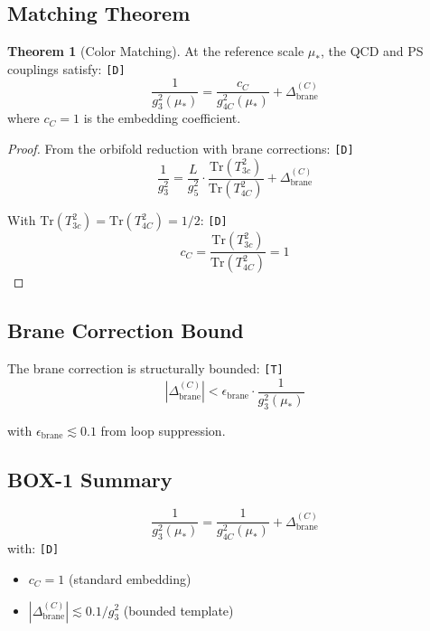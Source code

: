 \documentclass[11pt,a4paper]{article}
\newcommand{\tagD}{\textcolor{green!50!black}{\texttt{[D]}}}
\newcommand{\tagT}{\textcolor{cyan!70!black}{\texttt{[T]}}}
\theoremstyle{definition}
\newtheorem{theorem}{Theorem}[section]
\begin{document}
\subsection{Matching Theorem}
\label{subsec:matching-theorem}

\begin{theorem}[Color Matching]
\label{thm:color-matching}
At the reference scale $\mu_*$, the QCD and PS couplings satisfy: \tagD{}
\begin{equation}
\label{eq:color-matching-thm}
\frac{1}{g_3^2(\mu_*)} = \frac{c_C}{g_{4C}^2(\mu_*)} + \Delta_{\text{brane}}^{(C)}
\end{equation}
where $c_C = 1$ is the embedding coefficient.
\end{theorem}

\begin{proof}
From the orbifold reduction with brane corrections: \tagD{}
\begin{equation}
\label{eq:matching-proof}
\frac{1}{g_3^2} = \frac{L}{g_5^2} \cdot \frac{\text{Tr}(T_{3c}^2)}{\text{Tr}(T_{4C}^2)} + \Delta_{\text{brane}}^{(C)}
\end{equation}

With $\text{Tr}(T_{3c}^2) = \text{Tr}(T_{4C}^2) = 1/2$: \tagD{}
\begin{equation}
\label{eq:cc-unity}
c_C = \frac{\text{Tr}(T_{3c}^2)}{\text{Tr}(T_{4C}^2)} = 1
\end{equation}
\end{proof}

\subsection{Brane Correction Bound}
\label{subsec:brane-bound}

The brane correction is structurally bounded: \tagT{}
\begin{equation}
\label{eq:brane-bound-explicit}
|\Delta_{\text{brane}}^{(C)}| < \epsilon_{\text{brane}} \cdot \frac{1}{g_3^2(\mu_*)}
\end{equation}

with $\epsilon_{\text{brane}} \lesssim 0.1$ from loop suppression.

\subsection{BOX-1 Summary}
\label{subsec:box1-summary}

\begin{derivbox}
\begin{equation}
\label{eq:box1-canonical}
\boxed{\frac{1}{g_3^2(\mu_*)} = \frac{1}{g_{4C}^2(\mu_*)} + \Delta_{\text{brane}}^{(C)}}
\end{equation}
with: \tagD{}
\begin{itemize}
  \item $c_C = 1$ (standard embedding)
  \item $|\Delta_{\text{brane}}^{(C)}| \lesssim 0.1/g_3^2$ (bounded template)
\end{itemize}
\end{derivbox}
\end{document}
